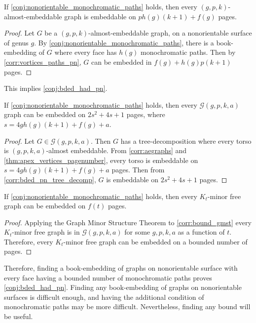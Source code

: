\begin{corollary}\label{corr:aegraphs}
	If \cref{conj:nonorientable_monochromatic_paths} holds, then every $(g, p, k)$-almost-embeddable graph is embeddable on $p h(g) (k + 1) + f(g)$ pages.
\end{corollary}

\begin{proof}
	Let $G$ be a $(g, p, k)$-almost-embeddable graph, on a nonorientable surface of genus $g$. By \cref{conj:nonorientable_monochromatic_paths}, there is a book-embedding of $G$ where every face has $h(g)$ monochromatic paths. Then by \cref{corr:vortices_paths_pn}, $G$ can be embedded in $f(g) + h(g) p (k+1)$ pages. 
\end{proof}

This implies \cref{conj:bded_had_pn}.
\begin{corollary}\label{corr:bound_gmst}
	If \cref{conj:nonorientable_monochromatic_paths} holds, then every $\mathcal{G}(g, p, k, a)$ graph can be embedded on $2s^2 + 4s + 1$ pages, where $s =  4g h(g) (k + 1) + f(g) + a$. 
\end{corollary}

\begin{proof}
	Let $G \in \mathcal{G}(g, p, k, a)$. Then $G$ has a tree-decomposition where every torso is $(g, p, k, a)$-almost embeddable. From \cref{corr:aegraphs} and \cref{thm:apex_vertices_pagenumber}, every torso is embeddable on $s = 4g h(g) (k + 1) + f(g) + a$ pages. Then from \cref{corr:bded_pn_tree_decomp}, $G$ is embeddable on $2s^2 + 4s + 1$ pages.
\end{proof}

\begin{corollary}
	If \cref{conj:nonorientable_monochromatic_paths} holds, then every $K_t$-minor free graph can be embedded on $f(t)$ pages. 
\end{corollary}

\begin{proof}
	Applying the Graph Minor Structure Theorem to \cref{corr:bound_gmst} every $K_t$-minor free graph is in $\mathcal{G}(g, p, k, a)$ for some $g, p, k, a$ as a function of $t$. Therefore, every $K_t$-minor free graph can be embedded on a bounded number of pages. 
\end{proof}

Therefore, finding a book-embedding of graphs on nonorientable surface with every face having a bounded number of monochromatic paths proves \cref{conj:bded_had_pn}. Finding any book-embedding of graphs on nonorientable surfaces is difficult enough, and having the additional condition of monochromatic paths may be more difficult. Nevertheless, finding any bound will be useful.
